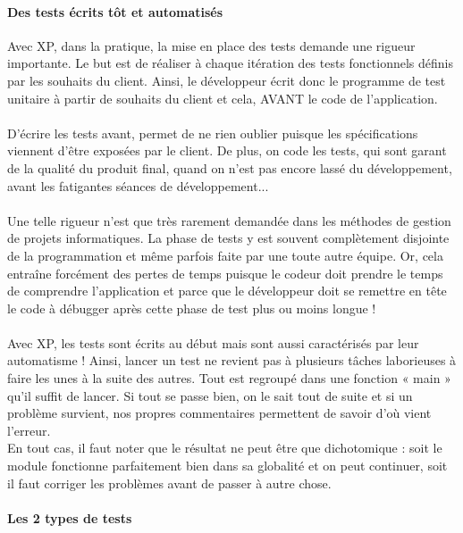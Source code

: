 \documentclass[]{article}
\let\oldparagraph\paragraph
\renewcommand{\paragraph}[1]{\oldparagraph{#1}\mbox{}}
\begin{document}
\hypertarget{des-tests-uxe9crits-tuxf4t-et-automatisuxe9s}{%
\paragraph{Des tests écrits tôt et
automatisés}\label{des-tests-uxe9crits-tuxf4t-et-automatisuxe9s}}

Avec XP, dans la pratique, la mise en place des tests demande une
rigueur importante. Le but est de réaliser à chaque itération des tests
fonctionnels définis par les souhaits du client. Ainsi, le développeur
écrit donc le programme de test unitaire à partir de souhaits du client
et cela, AVANT le code de l'application.~\\
~\\
D'écrire les tests avant, permet de ne rien oublier puisque les
spécifications viennent d'être exposées par le client. De plus, on code
les tests, qui sont garant de la qualité du produit final, quand on
n'est pas encore lassé du développement, avant les fatigantes séances de
développement...\\
~\\
Une telle rigueur n'est que très rarement demandée dans les méthodes de
gestion de projets informatiques. La phase de tests y est souvent
complètement disjointe de la programmation et même parfois faite par une
toute autre équipe. Or, cela entraîne forcément des pertes de temps
puisque le codeur doit prendre le temps de comprendre l'application et
parce que le développeur doit se remettre en tête le code à débugger
après cette phase de test plus ou moins longue !\\
~\\
Avec XP, les tests sont écrits au début mais sont aussi caractérisés par
leur automatisme ! Ainsi, lancer un test ne revient pas à plusieurs
tâches laborieuses à faire les unes à la suite des autres. Tout est
regroupé dans une fonction « main » qu'il suffit de lancer. Si tout se
passe bien, on le sait tout de suite et si un problème survient, nos
propres commentaires permettent de savoir d'où vient l'erreur.~\\
En tout cas, il faut noter que le résultat ne peut être que dichotomique
: soit le module fonctionne parfaitement bien dans sa globalité et on
peut continuer, soit il faut corriger les problèmes avant de passer à
autre chose.~




\hypertarget{les-2-types-de-tests}{%
\paragraph{Les 2 types de tests}\label{les-2-types-de-tests}}
\end{document}
